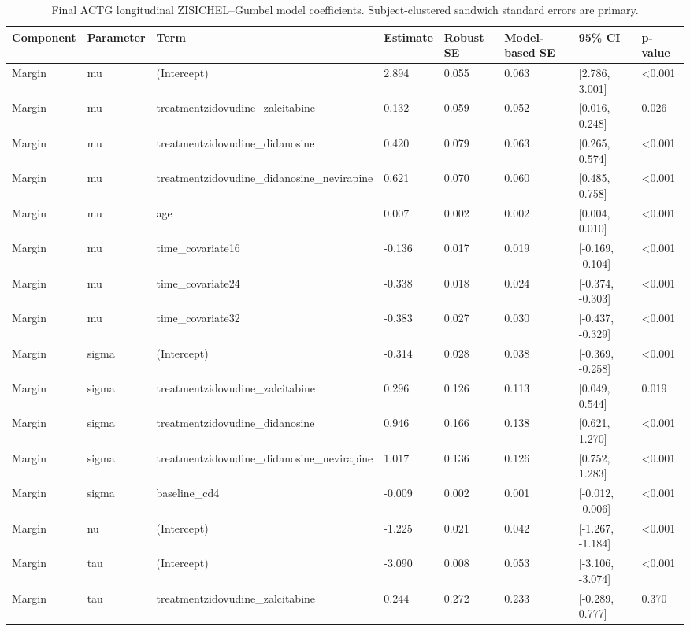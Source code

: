 \begin{table}

\caption{Final ACTG longitudinal ZISICHEL--Gumbel model coefficients. Subject-clustered sandwich standard errors are primary.}
\centering
\begin{tabular}[t]{llllllll}
\toprule
Component & Parameter & Term & Estimate & Robust SE & Model-based SE & 95\% CI & p-value\\
\midrule
Margin & mu & (Intercept) & 2.894 & 0.055 & 0.063 & {}[2.786, 3.001] & <0.001\\
Margin & mu & treatmentzidovudine\_zalcitabine & 0.132 & 0.059 & 0.052 & {}[0.016, 0.248] & 0.026\\
Margin & mu & treatmentzidovudine\_didanosine & 0.420 & 0.079 & 0.063 & {}[0.265, 0.574] & <0.001\\
Margin & mu & treatmentzidovudine\_didanosine\_nevirapine & 0.621 & 0.070 & 0.060 & {}[0.485, 0.758] & <0.001\\
Margin & mu & age & 0.007 & 0.002 & 0.002 & {}[0.004, 0.010] & <0.001\\
\addlinespace
Margin & mu & time\_covariate16 & -0.136 & 0.017 & 0.019 & {}[-0.169, -0.104] & <0.001\\
Margin & mu & time\_covariate24 & -0.338 & 0.018 & 0.024 & {}[-0.374, -0.303] & <0.001\\
Margin & mu & time\_covariate32 & -0.383 & 0.027 & 0.030 & {}[-0.437, -0.329] & <0.001\\
Margin & sigma & (Intercept) & -0.314 & 0.028 & 0.038 & {}[-0.369, -0.258] & <0.001\\
Margin & sigma & treatmentzidovudine\_zalcitabine & 0.296 & 0.126 & 0.113 & {}[0.049, 0.544] & 0.019\\
\addlinespace
Margin & sigma & treatmentzidovudine\_didanosine & 0.946 & 0.166 & 0.138 & {}[0.621, 1.270] & <0.001\\
Margin & sigma & treatmentzidovudine\_didanosine\_nevirapine & 1.017 & 0.136 & 0.126 & {}[0.752, 1.283] & <0.001\\
Margin & sigma & baseline\_cd4 & -0.009 & 0.002 & 0.001 & {}[-0.012, -0.006] & <0.001\\
Margin & nu & (Intercept) & -1.225 & 0.021 & 0.042 & {}[-1.267, -1.184] & <0.001\\
Margin & tau & (Intercept) & -3.090 & 0.008 & 0.053 & {}[-3.106, -3.074] & <0.001\\
\addlinespace
Margin & tau & treatmentzidovudine\_zalcitabine & 0.244 & 0.272 & 0.233 & {}[-0.289, 0.777] & 0.370\\

\end{tabular}
\end{table}
